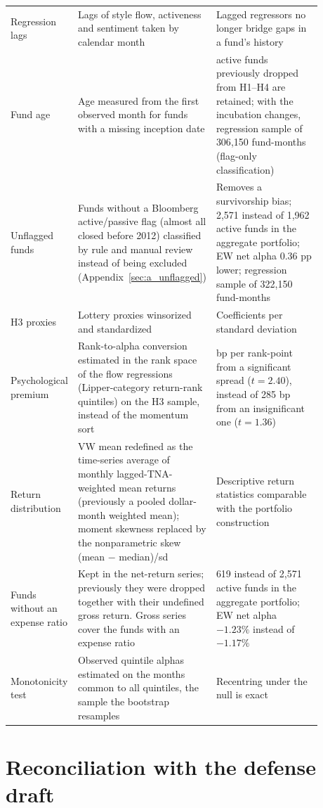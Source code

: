 \documentclass[12pt, oneside]{report}
\begin{document}
{\begin{longtable}{>{\raggedright\arraybackslash}p{0.16\linewidth}>{\raggedright\arraybackslash}p{0.36\linewidth}>{\raggedright\arraybackslash}p{0.36\linewidth}}
Regression lags & Lags of style flow, activeness and sentiment taken by calendar month & Lagged regressors no longer bridge gaps in a fund's history \\
Fund age & Age measured from the first observed month for funds with a missing inception date & 17 active funds previously dropped from H1--H4 are retained; with the incubation changes, regression sample of 306{,}150 fund-months (flag-only classification) \\
Unflagged funds & Funds without a Bloomberg active/passive flag (almost all closed before 2012) classified by rule and manual review instead of being excluded (Appendix~\ref{sec:a_unflagged}) & Removes a survivorship bias; 2{,}571 instead of 1{,}962 active funds in the aggregate portfolio; EW net alpha 0.36 pp lower; regression sample of 322{,}150 fund-months \\
H3 proxies & Lottery proxies winsorized and standardized & Coefficients per standard deviation \\
Psychological premium & Rank-to-alpha conversion estimated in the rank space of the flow regressions (Lipper-category return-rank quintiles) on the H3 sample, instead of the momentum sort & 295 bp per rank-point from a significant spread ($t = 2.40$), instead of 285 bp from an insignificant one ($t = 1.36$) \\
Return distribution & VW mean redefined as the time-series average of monthly lagged-TNA-weighted mean returns (previously a pooled dollar-month weighted mean); moment skewness replaced by the nonparametric skew (mean $-$ median)/sd & Descriptive return statistics comparable with the portfolio construction \\
Funds without an expense ratio & Kept in the net-return series; previously they were dropped together with their undefined gross return. Gross series cover the funds with an expense ratio & 2{,}619 instead of 2{,}571 active funds in the aggregate portfolio; EW net alpha $-1.23\%$ instead of $-1.17\%$ \\
Monotonicity test & Observed quintile alphas estimated on the months common to all quintiles, the sample the bootstrap resamples & Recentring under the null is exact \\
\end{longtable}
}

\section{Reconciliation with the defense draft}
\label{sec:k_reconciliation}
\end{document}
